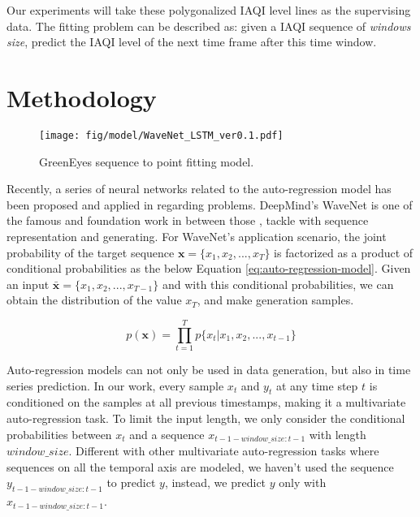 \documentclass[
twocolumn,
]{ceurart}
\begin{document}
Our experiments will take these polygonalized IAQI level lines as the supervising data. The fitting problem can be described as: given a IAQI sequence of \textit{windows size}, predict the IAQI level of the next time frame after this time window.


\section{Methodology}\label{sec:model_design}

\begin{figure*}[!htbp]
  \centering
  \texttt{[image: fig/model/WaveNet\_LSTM\_ver0.1.pdf]}
  \caption{GreenEyes sequence to point fitting model.}
  \label{fig:greeneyes_model}
\end{figure*}

Recently, a series of neural networks related to the auto-regression model has been proposed and applied in regarding problems. DeepMind's WaveNet \cite{oord2016wavenet} is one of the famous and foundation work in between those \cite{shen2018natural}, \cite{wang2017tacotron} tackle with sequence representation and generating. For WaveNet's application scenario, the joint probability of the target sequence $\textbf{x}=\{x_1,x_2,...,x_T\}$ is factorized as a product of conditional probabilities as the below Equation \ref{eq:auto-regression-model}. Given an input $\bar{\textbf{x}}=\{x_1,x_2,...,x_{T-1}\}$ and with this conditional probabilities, we can obtain the distribution of the value $x_T$, and make generation samples.

\begin{equation}
    p(\textbf{x})=\prod_{t=1}^Tp\{x_t|x_1,x_2,...,x_{t-1}\}
    \label{eq:auto-regression-model}
\end{equation}

Auto-regression models can not only be used in data generation, but also in time series prediction. In our work, every sample $x_t$ and $y_t$ at any time step $t$ is conditioned on the samples at all previous timestamps, making it a multivariate auto-regression task. To limit the input length,  we only consider the conditional probabilities between $x_t$ and a sequence $x_{t-1-window\_size:t-1}$ with length $window\_size$. Different with other multivariate auto-regression tasks where sequences on all the temporal axis are modeled, we haven't used the sequence $y_{t-1-window\_size:t-1}$ to predict $y$, instead, we predict $y$ only with $x_{t-1-window\_size:t-1}$.
\end{document}
